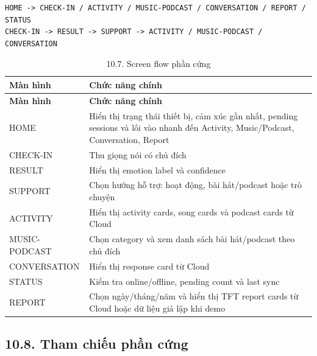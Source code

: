 \documentclass[12pt,a4paper]{article}
\begin{document}
\begin{verbatim}
HOME -> CHECK-IN / ACTIVITY / MUSIC-PODCAST / CONVERSATION / REPORT / STATUS
CHECK-IN -> RESULT -> SUPPORT -> ACTIVITY / MUSIC-PODCAST / CONVERSATION
\end{verbatim}

\begin{center}
\begin{longtable}{|P{0.30\textwidth}|P{0.62\textwidth}|}
\caption{10.7. Screen flow phần cứng}\\
\hline
\textbf{Màn hình} & \textbf{Chức năng chính} \\
\hline
\endfirsthead
\hline
\textbf{Màn hình} & \textbf{Chức năng chính} \\
\hline
\endhead
HOME & Hiển thị trạng thái thiết bị, cảm xúc gần nhất, pending sessions và lối vào nhanh đến Activity, Music/Podcast, Conversation, Report \\
\hline
CHECK-IN & Thu giọng nói có chủ đích \\
\hline
RESULT & Hiển thị emotion label và confidence \\
\hline
SUPPORT & Chọn hướng hỗ trợ: hoạt động, bài hát/podcast hoặc trò chuyện \\
\hline
ACTIVITY & Hiển thị activity cards, song cards và podcast cards từ Cloud \\
\hline
MUSIC-PODCAST & Chọn category và xem danh sách bài hát/podcast theo chủ đích \\
\hline
CONVERSATION & Hiển thị response card từ Cloud \\
\hline
STATUS & Kiểm tra online/offline, pending count và last sync \\
\hline
REPORT & Chọn ngày/tháng/năm và hiển thị TFT report cards từ Cloud hoặc dữ liệu giả lập khi demo \\
\hline
\end{longtable}
\end{center}

\subsection*{10.8. Tham chiếu phần cứng}
\end{document}
